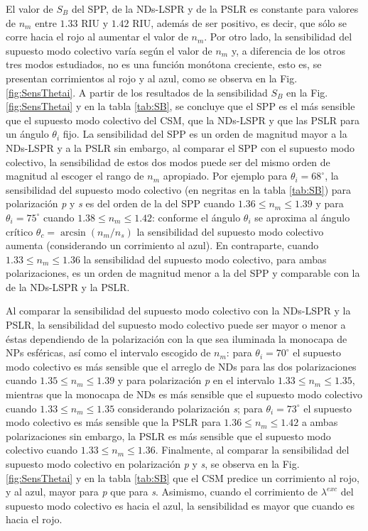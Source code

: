 El valor de $S_B$ del SPP, de la NDs-LSPR y de la PSLR es constante para valores de $n_m$ entre $1.33$ RIU y $1.42$ RIU, además de ser positivo, es decir, que sólo se corre hacia el rojo al aumentar el valor de $n_m$. Por otro lado, la sensibilidad del supuesto modo colectivo varía según el valor de $n_m$ y, a diferencia de los otros tres modos estudiados, no es una función monótona creciente, esto es, se presentan corrimientos al rojo y al azul, como se observa en la Fig. \ref{fig:SensThetai}. A partir de los resultados de la sensibilidad $S_B$ en la Fig. \ref{fig:SensThetai} y en la tabla \ref{tab:SB}, se concluye que el SPP es el más sensible que el supuesto modo colectivo del CSM, que la NDs-LSPR y que las PSLR para un ángulo $\theta_i$ fijo. La sensibilidad del SPP es un orden de magnitud mayor a la NDs-LSPR y a la PSLR sin embargo, al comparar el SPP con el supuesto modo colectivo, la sensibilidad de estos dos modos puede ser del mismo orden de magnitud al escoger el rango de $n_m$ apropiado. Por ejemplo para $\theta_i = 68^\circ$, la sensibilidad del supuesto modo colectivo (en negritas en la tabla \ref{tab:SB}) para polarización \emph{p} y \emph{s} es del orden de la del SPP cuando $1.36\leq n_m \leq 1.39$ y para $\theta_i =75^\circ$ cuando $1.38\leq n_m \leq 1.42$: conforme el ángulo $\theta_i$ se aproxima al ángulo crítico $\theta_c=\arcsin(n_m/n_s)$ la sensibilidad del supuesto modo colectivo aumenta (considerando un corrimiento al azul). En contraparte, cuando $1.33\leq n_m \leq 1.36$ la sensibilidad del supuesto modo colectivo, para ambas polarizaciones, es un orden de magnitud menor a la del SPP y comparable con la de la NDs-LSPR y la PSLR.

Al comparar la sensibilidad del supuesto modo colectivo con la NDs-LSPR y la PSLR, la sensibilidad del supuesto modo colectivo puede ser mayor o menor a éstas dependiendo de la polarización con la que sea iluminada la monocapa de NPs esféricas, así como el intervalo escogido de $n_m$:  para $\theta_i = 70^\circ$ el supuesto modo colectivo es más sensible que el arreglo de NDs para las dos polarizaciones cuando $1.35 \leq n_m \leq 1.39$ y para polarización \emph{p} en el intervalo $1.33\leq n_m \leq 1.35$, mientras que la monocapa de NDs es más sensible que el supuesto modo colectivo cuando $1.33\leq n_m \leq 1.35$ considerando polarización \emph{s}; para $\theta_i=73^\circ$ el supuesto modo colectivo es más sensible que la PSLR para $1.36\leq n_m \leq 1.42$  a ambas polarizaciones sin embargo, la PSLR es más sensible que el supuesto modo colectivo cuando $1.33\leq n_m \leq 1.36$. Finalmente, al comparar la sensibilidad del supuesto modo colectivo en polarización \emph{p} y \emph{s}, se observa en la Fig. \ref{fig:SensThetai} y en la tabla \ref{tab:SB} que el CSM predice un corrimiento al rojo, y al azul, mayor para \emph{p} que para \emph{s}. Asimismo, cuando el corrimiento de $\lambda^{exc}$ del supuesto modo colectivo es hacia el azul, la sensibilidad es mayor que cuando es hacia el rojo.

